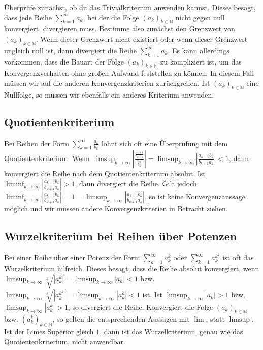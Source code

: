 \documentclass[fontsize=9pt,
               parskip=half-,
               DIV=14,
               listof=chapterentry,
               tocflat]{scrbook}
\begin{document}
Überprüfe zunächst, ob du das Trivialkriterium anwenden kannst. Dieses besagt, dass jede Reihe $\sum _{k=1}^{\infty }a_{k}$, bei der die Folge $(a_{k})_{k\in \mathbb {N} }$ nicht gegen null konvergiert, divergieren muss. Bestimme also zunächst den Grenzwert von $(a_{k})_{k\in \mathbb {N} }$. Wenn dieser Grenzwert nicht existiert oder wenn dieser Grenzwert ungleich null ist, dann divergiert die Reihe $\sum _{k=1}^{\infty }a_{k}$. Es kann allerdings vorkommen, dass die Bauart der Folge $(a_{k})_{k\in \mathbb {N} }$ zu kompliziert ist, um das Konvergenzverhalten ohne großen Aufwand feststellen zu können. In diesem Fall müssen wir auf die anderen Konvergenzkriterien zurückgreifen. Ist $(a_{k})_{k\in \mathbb {N} }$ eine Nullfolge, so müssen wir ebenfalls ein anderes Kriterium anwenden.

\subsection{Quotientenkriterium}

Bei Reihen der Form $\sum _{k=1}^{\infty }{\frac {a_{k}}{b_{k}}}$ lohnt sich oft eine Überprüfung mit dem Quotientenkriterium. Wenn $\limsup _{k\to \infty }\left|{\tfrac {\tfrac {a_{k+1}}{b_{k+1}}}{\tfrac {a_{k}}{b_{k}}}}\right|=\limsup _{k\to \infty }\left|{\tfrac {a_{k+1}b_{k}}{b_{k+1}a_{k}}}\right|<1$, dann konvergiert die Reihe nach dem Quotientenkriterium absolut. Ist $\liminf _{k\to \infty }\left|{\tfrac {a_{k+1}b_{k}}{b_{k+1}a_{k}}}\right|>1$, dann divergiert die Reihe. Gilt jedoch $\liminf _{k\to \infty }\left|{\tfrac {a_{k+1}b_{k}}{b_{k+1}a_{k}}}\right|=1=\limsup _{k\to \infty }\left|{\tfrac {a_{k+1}b_{k}}{b_{k+1}a_{k}}}\right|$, so ist keine Konvergenzaussage möglich und wir müssen andere Konvergenzkriterien in Betracht ziehen.

\subsection{Wurzelkriterium bei Reihen über Potenzen}

Bei einer Reihe über einer Potenz der Form $\sum _{k=1}^{\infty }a_{k}^{k}$ oder $\sum _{k=1}^{\infty }a_{k}^{k^{2}}$ ist oft das Wurzelkriterium hilfreich. Dieses besagt, dass die Reihe absolut konvergiert, wenn $\limsup _{k\to \infty }{\sqrt[{k}]{|a_{k}^{k}|}}=\limsup _{k\to \infty }|a_{k}|<1$ bzw. $\limsup _{k\to \infty }{\sqrt[{k}]{|a_{k}^{k^{2}}|}}=\limsup _{k\to \infty }|a_{k}^{k}|<1$ ist. Ist $\limsup _{k\to \infty }|a_{k}|>1$ bzw. $\limsup _{k\to \infty }|a_{k}^{k}|>1$, so divergiert die Reihe. Konvergiert die Folge $(a_{k})_{k\in \mathbb {N} }$ bzw. $(a_{k}^{k})_{k\in \mathbb {N} }$, so gelten die entsprechenden Aussagen mit $\lim $, statt $\limsup $. Ist der Limes Superior gleich $1$, dann ist das Wurzelkriterium, genau wie das Quotientenkriterium, nicht anwendbar.
\end{document}
